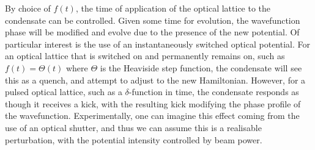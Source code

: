 {By choice of $f(t)$, the time of application of the optical lattice to the condensate can be controlled. Given some time for evolution, the wavefunction phase will be modified and evolve due to the presence of the new potential. Of particular interest is the use of an instantaneously switched optical potential. For an optical lattice that is switched on and permanently remains on, such as $f(t) = \Theta(t)$ where $\Theta$ is the Heaviside step function, the condensate will see this as a quench, and attempt to adjust to the new Hamiltonian. However, for a pulsed optical lattice, such as a $\delta$-function in time, the condensate responds as though it receives a kick, with the resulting kick modifying the phase profile of the wavefunction. Experimentally, one can imagine this effect coming from the use of an optical shutter, and thus we can assume this is a realisable perturbation, with the potential intensity controlled by beam power.


}
